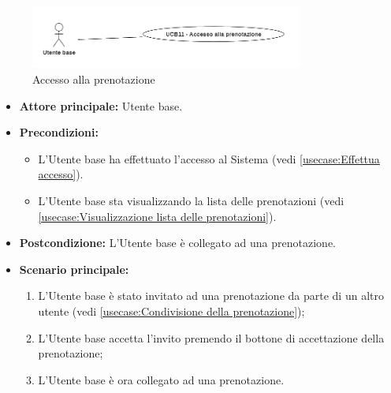 \newpage
{}
\label{usecase:Accesso alla prenotazione}

\begin{figure}[h]
	\centering
	\includegraphics[width=0.8\textwidth]{./uml/UCB11.png} 
	\caption{Accesso alla prenotazione}
	\label{fig:UCB11}
  \end{figure}

\begin{itemize}
	\item \textbf{Attore principale:} Utente base.

	\item \textbf{Precondizioni:} 
	\begin{itemize}
		\item L'Utente base ha effettuato l'accesso al Sistema (vedi \autoref{usecase:Effettua accesso}).
		\item L'Utente base sta visualizzando la lista delle prenotazioni (vedi \autoref{usecase:Visualizzazione lista delle prenotazioni}).
	\end{itemize}
		

	\item \textbf{Postcondizione:} L'Utente base è collegato ad una prenotazione.

	\item \textbf{Scenario principale:}
	      \begin{enumerate}
		      \item L'Utente base è stato invitato ad una prenotazione da parte di un altro utente (vedi \autoref{usecase:Condivisione della prenotazione});
		      \item L'Utente base accetta l'invito premendo il bottone di accettazione della prenotazione;
		      \item L'Utente base è ora collegato ad una prenotazione.
	      \end{enumerate}
\end{itemize}
